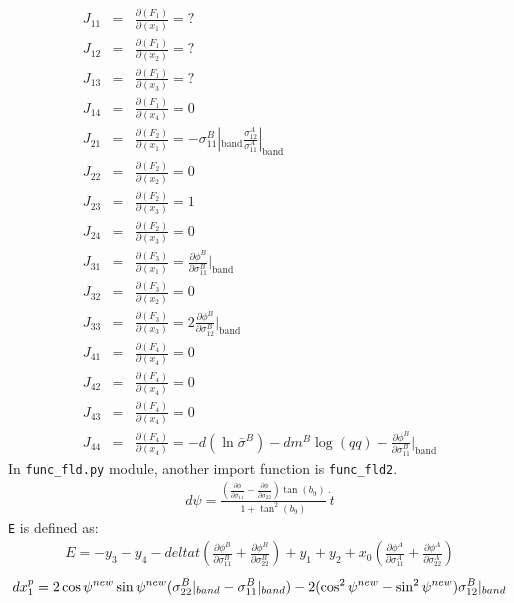 \documentclass[12pt]{amsart}
\begin{document}
\begin{eqnarray}
  \label{eq:jacob_func_fld1}
  J_{11}&=&\frac{\partial(F_1)}{\partial(x_1)}=  ?\\
  J_{12}&=&\frac{\partial(F_1)}{\partial(x_2)}= ?\nonumber \\
  J_{13}&=&\frac{\partial(F_1)}{\partial(x_3)}= ?\nonumber\\
  J_{14}&=&\frac{\partial(F_1)}{\partial(x_4)}=0  \nonumber\\
  J_{21}&=&\frac{\partial(F_2)}{\partial(x_1)}=-\sigma_{11}^B|_\text{band} \frac{\sigma_{12}^A}{\sigma_{11}^A}|_\text{band}  \nonumber\\
  J_{22}&=&\frac{\partial(F_2)}{\partial(x_2)}=0  \nonumber\\
  J_{23}&=&\frac{\partial(F_2)}{\partial(x_3)}=1  \nonumber\\
  J_{24}&=&\frac{\partial(F_2)}{\partial(x_3)}=0  \nonumber\\
  J_{31}&=&\frac{\partial(F_3)}{\partial(x_1)}=\frac{\partial \phi^B}{\partial \sigma^B_{11}}|_\text{band}    \nonumber\\
  J_{32}&=&\frac{\partial(F_3)}{\partial(x_2)}=0  \nonumber\\
  J_{33}&=&\frac{\partial(F_3)}{\partial(x_3)}=2 \frac{\partial \phi^B}{\partial \sigma^B_{12}}|_\text{band}  \nonumber\\
  J_{41}&=&\frac{\partial(F_4)}{\partial(x_4)}=0 \nonumber\\
  J_{42}&=&\frac{\partial(F_4)}{\partial(x_4)}=0\nonumber\\
  J_{43}&=&\frac{\partial(F_4)}{\partial(x_4)}=0\nonumber\\
  J_{44}&=&\frac{\partial(F_4)}{\partial(x_4)}=-d(\ln{\bar{\sigma}^B}) - dm^B \log(qq)-\frac{\partial \phi^B}{\partial \sigma^B_{11}}|_\text{band}\nonumber
\end{eqnarray}
In \verb|func_fld.py| module, another import function is \verb|func_fld2|.
\begin{eqnarray}
  \label{eq:dpsi}
  d\psi=\frac{ (\frac{\partial \phi}{\partial\sigma_{11}}-\frac{\partial \phi}{\partial\sigma_{22}}) \tan(b_9)}    {1+\tan^2(b_9)}\  \dot{t}
\end{eqnarray}
\verb|E| is defined as:
\begin{eqnarray}
  \label{eq:yancien}
  E = -y_3 - y_4 - deltat (\frac{\partial \phi^B}{\partial\sigma^B_{11}}+\frac{\partial \phi^B}{\partial\sigma^B_{22}})+y_1+y_2+x_0(\frac{\partial \phi^A}{\partial\sigma^A_{11}}+\frac{\partial \phi^A}{\partial\sigma^A_{22}})
\end{eqnarray}
\begin{equation}
  \label{eq:dxp}
  dx^p_1=2\cos\psi^{new}\sin\psi^{new}(\sigma_{22}^B|_{band}-\sigma_{11}^B|_{band}) \\
  - 2 (\cos^2\psi^{new}-\sin^2\psi^{new}) \sigma_{12}^B|_{band}
\end{equation}
\end{document}
